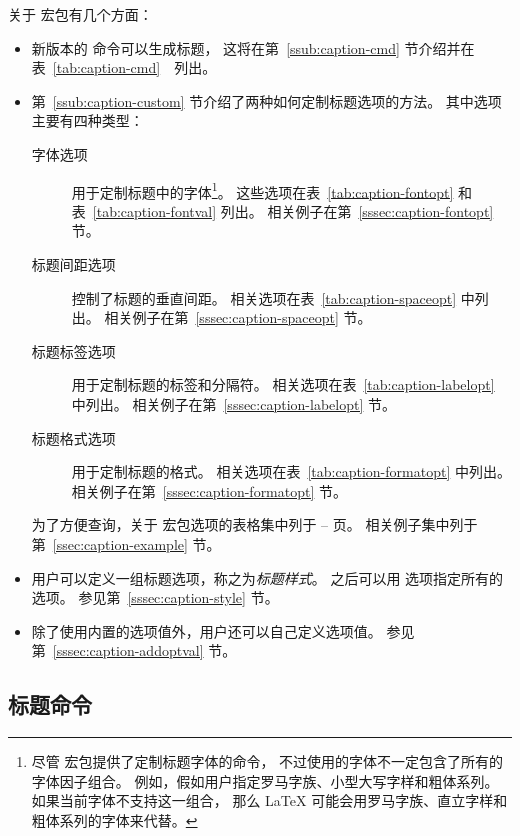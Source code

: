 关于  宏包有几个方面：
\begin{itemize}
	\item 新版本的  命令可以生成标题，
	这将在第~\ref{ssub:caption-cmd} 节介绍并在表~\ref{tab:caption-cmd}　列出。
	
	\item 第~\ref{ssub:caption-custom} 节介绍了两种如何定制标题选项的方法。
	其中选项主要有四种类型：
	\begin{description}
		\item[字体选项] 用于定制标题中的字体\footnote{%
			尽管  宏包提供了定制标题字体的命令，
			不过使用的字体不一定包含了所有的字体因子组合。
			例如，假如用户指定罗马字族、小型大写字样和粗体系列。
			如果当前字体不支持这一组合，
			那么 \LaTeX{} 可能会用罗马字族、直立字样和粗体系列的字体来代替。}。
		这些选项在表~\ref{tab:caption-fontopt} 和表~\ref{tab:caption-fontval} 列出。
		相关例子在第~\ref{sssec:caption-fontopt} 节。
		
		\item[标题间距选项] 控制了标题的垂直间距。
		相关选项在表~\ref{tab:caption-spaceopt} 中列出。
		相关例子在第~\ref{sssec:caption-spaceopt} 节。
		
		\item[标题标签选项] 用于定制标题的标签和分隔符。
		相关选项在表~\ref{tab:caption-labelopt} 中列出。
		相关例子在第~\ref{sssec:caption-labelopt} 节。
		
		\item[标题格式选项] 用于定制标题的格式。
		相关选项在表~\ref{tab:caption-formatopt} 中列出。
		相关例子在第~\ref{sssec:caption-formatopt} 节。
	\end{description}
	为了方便查询，关于  宏包选项的表格集中列于 \pageref{tab:caption-fontopt}--\pageref{tab:caption-formatopt} 页。
	相关例子集中列于第~\ref{ssec:caption-example} 节。
	
	\item 用户可以定义一组标题选项，称之为\emph{标题样式}。
	之后可以用  选项指定所有的选项。
	参见第~\ref{sssec:caption-style} 节。
	
	\item 除了使用内置的选项值外，用户还可以自己定义选项值。
	参见第~\ref{sssec:caption-addoptval} 节。
\end{itemize}

\subsection{标题命令} \label{ssec:caption-cmd}

